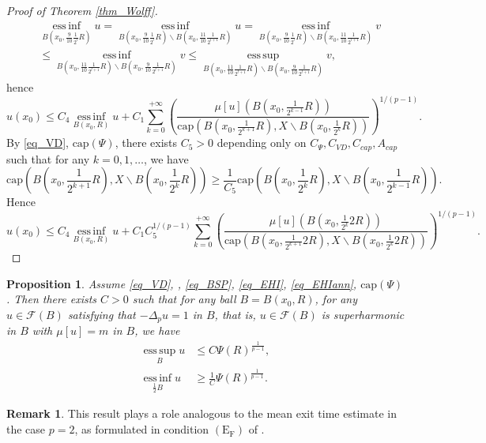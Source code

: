 \documentclass[11pt,a4paper]{article}
\numberwithin{equation}{section}
\newcommand{\esup}{\operatorname*{ess\,sup}}
\newcommand{\einf}{\operatorname*{ess\,inf}}
\theoremstyle{plain}
\newtheorem{proposition}[theorem]{Proposition}
\theoremstyle{definition}
\newtheorem{remark}[theorem]{Remark}
\begin{document}
\begin{proof}[Proof of Theorem \ref{thm_Wolff}]
\begin{align*}
&\einf_{B(x_0,\frac{9}{10}\frac{1}{2^{l}}R)}u= \einf_{B(x_0,\frac{9}{10}\frac{1}{2^{l}}R)\backslash B(x_0,\frac{11}{10}\frac{1}{2^{l+1}}R)}u=\einf_{B(x_0,\frac{9}{10}\frac{1}{2^{l}}R)\backslash B(x_0,\frac{11}{10}\frac{1}{2^{l+1}}R)}v\\
&\le \einf_{B(x_0,\frac{11}{10}\frac{1}{2^{l+1}}R)\backslash B(x_0,\frac{9}{10}\frac{1}{2^{l+1}}R)}v\le \esup_{B(x_0,\frac{11}{10}\frac{1}{2^{l+1}}R)\backslash B(x_0,\frac{9}{10}\frac{1}{2^{l+1}}R)}v,
\end{align*}
hence
$$u(x_0)\le C_4\einf_{B(x_0,R)}u+C_1\sum_{k=0}^{+\infty}\left(\frac{\mu[u](B(x_0,\frac{1}{2^{k-1}}R))}{\mathrm{cap}\left(B(x_0,\frac{1}{2^{k+1}}R),X\backslash B(x_0,\frac{1}{2^k}R)\right)}\right)^{1/(p-1)}.$$
By \ref{eq_VD}, \hyperlink{eq_cap}{$\text{cap}(\Psi)$}, there exists $C_5>0$ depending only on $C_\Psi,C_{VD},C_{cap},A_{cap}$ such that for any $k=0,1,\ldots$, we have
$$\mathrm{cap}\left(B(x_0,\frac{1}{2^{k+1}}R),X\backslash B(x_0,\frac{1}{2^k}R)\right)\ge \frac{1}{C_5}\mathrm{cap}\left(B(x_0,\frac{1}{2^{k}}R),X\backslash B(x_0,\frac{1}{2^{k-1}}R)\right).$$
Hence
$$u(x_0)\le C_4\einf_{B(x_0,R)}u+C_1C_5^{1/(p-1)}\sum_{k=0}^{+\infty}\left(\frac{\mu[u](B(x_0,\frac{1}{2^{k}}2R))}{\mathrm{cap}\left(B(x_0,\frac{1}{2^{k+1}}2R),X\backslash B(x_0,\frac{1}{2^k}2R)\right)}\right)^{1/(p-1)}.$$
\end{proof}

\begin{proposition}\label{prop_EF}
Assume \ref{eq_VD}, \hyperlink{eq_LSC}{}, \ref{eq_BSP}, \ref{eq_EHI}, \ref{eq_EHIann}, \hyperlink{eq_cap}{$\text{cap}(\Psi)$}. Then there exists $C>0$ such that for any ball $B=B(x_0,R)$, for any $u\in\mathcal{F}(B)$ satisfying that $-\Delta_pu=1$ in $B$, that is, $u\in\mathcal{F}(B)$ is superharmonic in $B$ with $\mu[u]=m$ in $B$, we have
\begin{align}
\esup_{B}u&\le C\Psi(R)^{\frac{1}{p-1}},\label{eq_EF1}\\
\einf_{\frac{1}{2}B}u&\ge \frac{1}{C}\Psi(R)^{\frac{1}{p-1}}.\label{eq_EF2}
\end{align}
\end{proposition}

\begin{remark}
This result plays a role analogous to the mean exit time estimate in the case $p=2$, as formulated in condition $(\text{E}_{\text{F}})$ of \cite[Definition 3.10]{GH14}.
\end{remark}
\end{document}
